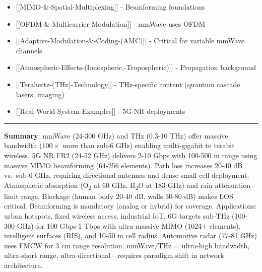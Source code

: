 \begin{itemize}
\tightlist
\item
  {[}{[}MIMO-\&-Spatial-Multiplexing{]}{]} - Beamforming foundations
\item
  {[}{[}OFDM-\&-Multicarrier-Modulation{]}{]} - mmWave uses OFDM
\item
  {[}{[}Adaptive-Modulation-\&-Coding-(AMC){]}{]} - Critical for
  variable mmWave channels
\item
  {[}{[}Atmospheric-Effects-(Ionospheric,-Tropospheric){]}{]} -
  Propagation background
\item
  {[}{[}Terahertz-(THz)-Technology{]}{]} - THz-specific content (quantum
  cascade lasers, imaging)
\item
  {[}{[}Real-World-System-Examples{]}{]} - 5G NR deployments
\end{itemize}

\begin{center}\rule{0.5\linewidth}{0.5pt}\end{center}

\textbf{Summary}: mmWave (24-300 GHz) and THz (0.3-10 THz) offer massive
bandwidth ($100\times$ more than sub-6 GHz) enabling
multi-gigabit to terabit wireless. 5G NR FR2 (24-52 GHz) delivers 2-10
Gbps with 100-500 m range using massive MIMO beamforming (64-256
elements). Path loss increases 20-40 dB vs.~sub-6 GHz, requiring
directional antennas and dense small-cell deployment. Atmospheric
absorption (O\textsubscript{2} at 60 GHz,
H\textsubscript{2}O at 183 GHz) and rain attenuation
limit range. Blockage (human body 20-40 dB, walls 30-80 dB) makes LOS
critical. Beamforming is mandatory (analog or hybrid) for coverage.
Applications: urban hotspots, fixed wireless access, industrial IoT. 6G
targets sub-THz (100-300 GHz) for 100 Gbps-1 Tbps with ultra-massive
MIMO (1024+ elements), intelligent surfaces (RIS), and 10-50 m cell
radius. Automotive radar (77-81 GHz) uses FMCW for 3 cm range
resolution. mmWave/THz = ultra-high bandwidth, ultra-short range,
ultra-directional---requires paradigm shift in network architecture.
